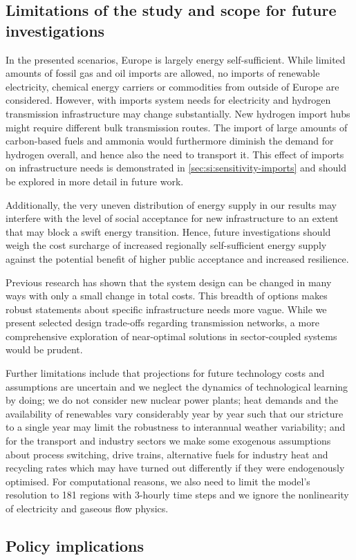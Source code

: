 \subsection*{Limitations of the study and scope for future investigations}

In the presented scenarios, Europe is largely energy self-sufficient. While
limited amounts of fossil gas and oil imports are allowed, no imports of
renewable electricity, chemical energy carriers or commodities from outside of
Europe are considered. However, with imports system needs for electricity and
hydrogen transmission infrastructure may change substantially. New hydrogen
import hubs might require different bulk transmission routes. The import of
large amounts of carbon-based fuels and ammonia would furthermore diminish the
demand for hydrogen overall, and hence also the need to transport it. This
effect of imports on infrastructure needs is demonstrated in \cref{sec:si:sensitivity-imports} and should be explored in more detail in future work.
\cite{fasihiTechnoeconomicAssessment2019,heuserTechnoeconomicAnalysis2019,hamppImportOptions2021}


Additionally, the very uneven distribution of energy supply in our results may
interfere with the level of social acceptance for new infrastructure to an
extent that may block a swift energy transition.
\cite{sasseDistributionalTradeoffs2019,sasseRegionalImpacts2020} Hence, future
investigations should weigh the cost surcharge of increased regionally
self-sufficient energy supply against the potential benefit of higher public
acceptance and increased resilience.

Previous research has shown that the system design can be changed in many ways
with only a small change in total
costs.\cite{Neumann2019,lombardiPolicyDecision2020,pedersenModelingAll2021,pickeringDiversityOptions2022}
This breadth of options makes robust statements about specific infrastructure
needs more vague. While we present selected design trade-offs regarding
transmission networks, a more comprehensive exploration of near-optimal
solutions in sector-coupled systems would be prudent.

Further limitations include that projections for future technology costs and
assumptions are uncertain and we neglect the dynamics of technological learning
by doing; we do not consider new nuclear power plants; heat demands and the
availability of renewables vary considerably year by year such that our
stricture to a single year may limit the robustness to interannual weather
variability; and for the transport and industry sectors we make some exogenous
assumptions about process switching, drive trains, alternative fuels for
industry heat and recycling rates which may have turned out differently if they
were endogenously optimised. For computational reasons, we also need to limit
the model's resolution to 181 regions with 3-hourly time steps and we ignore the
nonlinearity of electricity and gaseous flow physics.



\subsection*{Policy implications}

